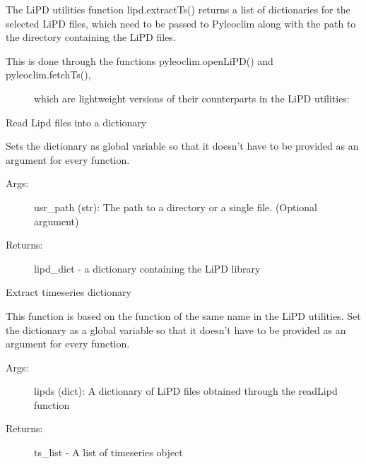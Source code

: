 \documentclass[letterpaper,10pt,english]{sphinxmanual}
\begin{document}
The LiPD utilities function lipd.extractTs() returns a list of dictionaries for
the selected LiPD files, which need to be passed to Pyleoclim along with the path
to the directory containing the LiPD files.
\begin{description}
\item[{This is done through the functions pyleoclim.openLiPD() and pyleoclim.fetchTs(),}] \leavevmode
which are lightweight versions of their counterparts in the LiPD utilities:

\end{description}

\begin{fulllineitems}
\label{\detokenize{Main:pyleoclim.openLipd}}
Read Lipd files into a dictionary

Sets the dictionary as global variable so that it doesn’t have to be provided
as an argument for every function.
\begin{description}
\item[{Args:}] \leavevmode
usr\_path (str): The path to a directory or a single file. (Optional argument)

\item[{Returns:}] \leavevmode
lipd\_dict - a dictionary containing the LiPD library

\end{description}

\end{fulllineitems}


\begin{fulllineitems}
\label{\detokenize{Main:pyleoclim.fetchTs}}
Extract timeseries dictionary

This function is based on the function of the same name in the LiPD utilities.
Set the dictionary as a global variable so that it doesn’t have to be
provided as an argument for every function.
\begin{description}
\item[{Args:}] \leavevmode
lipds (dict): A dictionary of LiPD files obtained through the 
readLipd function

\item[{Returns:}] \leavevmode
ts\_list - A list of timeseries object

\end{description}

\end{fulllineitems}
\end{document}
